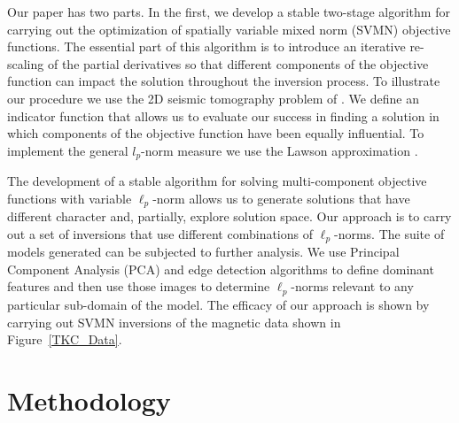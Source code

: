 \documentclass[extra,referee]{gji}
\begin{document}
Our paper has two parts. In the first, we develop a stable two-stage algorithm for carrying out the optimization of spatially variable mixed norm (SVMN) objective functions. The essential part of this algorithm is to introduce an iterative re-scaling of the partial derivatives so that different components of the objective function can impact the solution throughout the inversion process. To illustrate our procedure we use the 2D seismic tomography problem of \citet{SunLi14}. We define an indicator function that allows us to evaluate our success in finding a solution in which components of the objective function have been equally influential. To implement the general $l_p$-norm measure we use the Lawson approximation \cite[]{Lawson61}.

The development of a stable algorithm for solving multi-component objective functions with variable $\ell_p$-norm allows us to generate solutions that have different character and, partially, explore solution space. Our approach is to carry out a set of inversions that use different combinations of $\ell_p$-norms. The suite of models generated can be subjected to further analysis. We use Principal Component Analysis (PCA) and edge detection algorithms to define dominant features and then use those images to determine $\ell_p$-norms relevant to any particular sub-domain of the model. The efficacy of our approach is shown by carrying out SVMN inversions of the magnetic data shown in Figure~\ref{TKC_Data}.


\section{Methodology}
\end{document}
